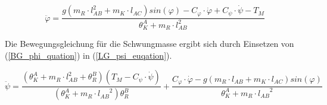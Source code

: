 \begin{equation}
\label{BG_phi_quation}
\ddot{\varphi} = \frac{g(m_R \cdot l_{AB}^2 + m_K \cdot l_{AC})sin(\varphi) - C_{\varphi} \cdot \dot{\varphi} + C_{\psi} \cdot \dot{\psi} - T_M}{{\theta}^A_K + m_R \cdot l_{AB}^2}
\end{equation}

Die Bewegungsgleichung für die Schwungmasse ergibt sich durch Einsetzen von (\ref{BG_phi_quation}) in (\ref{LG_psi_euqation}).

\begin{equation}
\label{BG_psi_equation}
\ddot{\psi} = \frac{({\theta}^A_K + m_R \cdot l_{AB}^2 + {\theta}^B_R)(T_M - C_{\psi} \cdot \dot{\psi})}{({\theta}^A_K + m_R \cdot {l_{AB}}^2){\theta}^B_R} + \frac{C_{\varphi} \cdot \dot{\varphi} - g(m_R \cdot l_{AB} + m_K \cdot l_{AC})sin(\varphi)}{{\theta}^A_K + m_R \cdot {l_{AB}}^2}
\end{equation}